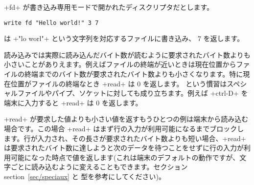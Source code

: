 
\begin{example}
\ml+fd+ が書き込み専用モードで開かれたディスクリプタだとします。
%
\begin{lstlisting}
write fd "Hello world!" 3 7
\end{lstlisting}
%
は \ml+"lo worl"+ という文字列を対応するファイルに書き込み、 7 を返します。
\end{example}

読み込みでは実際に読み込んだバイト数が読むように要求されたバイト数よりも小さいことがありえます。例えばファイルの終端が近いときは現在位置からファイルの終端までのバイト数が要求されたバイト数よりも小さくなります。特に現在位置がファイルの終端なとき \ml+read+ は 0 を返します。 という慣習はスペシャルファイルやパイプ、ソケットに対しても成り立ちます。例えば \ml+ctrl-D+ を端末に入力すると \ml+read+ は 0 を返します。

\ml+read+ が要求した値よりも小さい値を返すもうひとつの例は端末から読み込む場合です。この場合 \ml+read+ はまず行の入力が利用可能になるまでブロックします。行が入力され、その長さが要求されたバイト数よりも短い場合、\ml+read+ は要求されたバイト数に達しようと次のデータを待つことをせずに行の入力が利用可能になった時点で値を返します(これは端末のデフォルトの動作ですが、文字ごとに読み込むように変えることもできます。セクション section~\ref{sec/speciaux} と  型を参考にしてください)。

